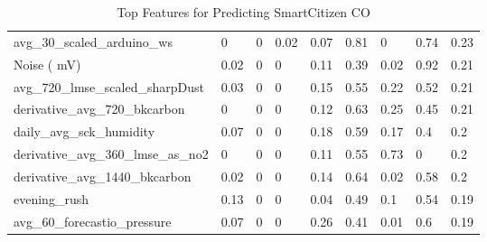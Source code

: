 \begin{table}[H]
\begin{tabular}{lllllllll}
avg\_30\_scaled\_arduino\_ws        & 0     & 0          & 0.02 & 0.07 & 0.81  & 0         & 0.74 & 0.23 \\
Noise ( mV)                         & 0.02  & 0          & 0    & 0.11 & 0.39  & 0.02      & 0.92 & 0.21 \\
avg\_720\_lmse\_scaled\_sharpDust   & 0.03  & 0          & 0    & 0.15 & 0.55  & 0.22      & 0.52 & 0.21 \\
derivative\_avg\_720\_bkcarbon      & 0     & 0          & 0    & 0.12 & 0.63  & 0.25      & 0.45 & 0.21 \\
daily\_avg\_sck\_humidity           & 0.07  & 0          & 0    & 0.18 & 0.59  & 0.17      & 0.4  & 0.2  \\
derivative\_avg\_360\_lmse\_as\_no2 & 0     & 0          & 0    & 0.11 & 0.55  & 0.73      & 0    & 0.2  \\
derivative\_avg\_1440\_bkcarbon     & 0.02  & 0          & 0    & 0.14 & 0.64  & 0.02      & 0.58 & 0.2  \\
evening\_rush                       & 0.13  & 0          & 0    & 0.04 & 0.49  & 0.1       & 0.54 & 0.19 \\
avg\_60\_forecastio\_pressure       & 0.07  & 0          & 0    & 0.26 & 0.41  & 0.01      & 0.6  & 0.19 \\
\bottomrule
\end{tabular}
\label{tab:as1_co_top_features}
\caption{Top Features for Predicting SmartCitizen CO}
\end{table}

